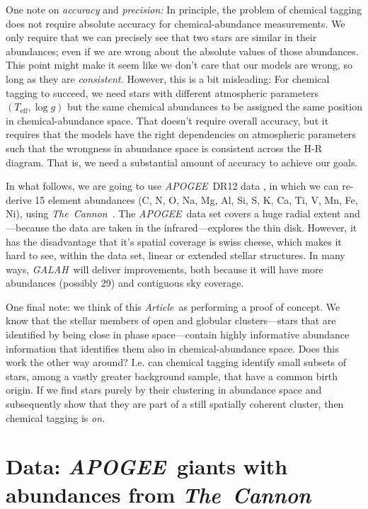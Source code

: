 \documentclass[12pt, letterpaper, preprint]{aastex}
\newcommand{\acronym}[1]{{\small{#1}}}
\newcommand{\project}[1]{\textsl{#1}}
\newcommand{\apogee}{\project{\acronym{APOGEE}}}
\newcommand{\galah}{\project{\acronym{GALAH}}}
\newcommand{\thecannon}{\project{The~Cannon}}
\newcommand{\documentname}{\textsl{Article}}
\newcommand{\teff}{T_{\mathrm{eff}}}
\newcommand{\logg}{\log g}
\begin{document}
One note on \emph{accuracy} and \emph{precision:}
In principle, the problem of chemical tagging does not require
absolute accuracy for chemical-abundance measurements.
We only require that we can precisely see that two stars are similar
in their abundances; even if we are wrong about the absolute values of
those abundances.
This point might make it seem like we don't care that our models are
wrong, so long as they are \emph{consistent.}
However, this is a bit misleading:
For chemical tagging to succeed, we need stars with different
atmospheric parameters $(\teff, \logg)$ but the same chemical
abundances to be assigned the same position in chemical-abundance
space.
That doesn't require overall accuracy, but it requires that the models
have the right dependencies on atmospheric parameters such that the
wrongness in abundance space is consistent across the H-R diagram.
That is, we need a substantial amount of accuracy to achieve our goals.

In what follows, we are going to use \apogee\ \acronym{DR12} data \citep{dr12}, in
which we can re-derive 15 element abundances (C, N, O, Na, Mg, Al, Si,
S, K, Ca, Ti, V, Mn, Fe, Ni), using \thecannon\ \citep{thecannon}.
The \apogee\ data set covers a huge radial extent and---because the
data are taken in the infrared---explores the thin disk.
However, it has the disadvantage that it's spatial coverage is swiss
cheese, which makes it hard to see, within the data set, linear or
extended stellar structures.
In many ways, \galah\ will deliver improvements, both because it will
have more abundances (possibly 29) and contiguous sky coverage.

One final note:
we think of this \documentname\ as performing a proof of concept.
We know that the stellar members of open and globular clusters---stars
that are identified by being close in phase space---contain highly
informative abundance information that identifies them also in
chemical-abundance space.
Does this work the other way around? I.e. can chemical tagging identify small subsets of stars, among a vastly greater background sample, that have a common birth origin. If we find stars purely by their clustering in abundance space and subsequently show that they are part of a still spatially coherent cluster, then chemical tagging is
\emph{on.}

\section{Data: \apogee\ giants with abundances from \thecannon}\label{sec:data}
\end{document}
